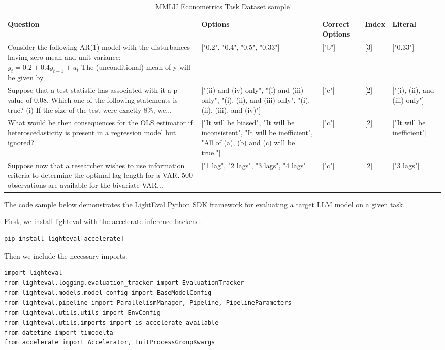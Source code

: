 \begin{table*}[h]
\caption{MMLU Econometrics Task Dataset sample}
\label{mmlu-econometrics}
\begin{tabular}{p{}p{}p{}p{}p{}}
\hline
Question & Options & Correct Options & Index & Literal \\
\hline
Consider the following AR(1) model with the disturbances having zero mean and unit variance: $y_t = 0.2 + 0.4 y_{t-1} + u_t$ The (unconditional) mean of y will be given by & ["0.2", "0.4", "0.5", "0.33"] & ["b"] & [3] & ["0.33"] \\
\hline
Suppose that a test statistic has associated with it a p-value of 0.08. Which one of the following statements is true? (i) If the size of the test were exactly 8\%, we... & ["(ii) and (iv) only", "(i) and (iii) only", "(i), (ii), and (iii) only", "(i), (ii), (iii), and (iv)"] & ["c"] & [2] & ["(i), (ii), and (iii) only"] \\
\hline
What would be then consequences for the OLS estimator if heteroscedasticity is present in a regression model but ignored? & ["It will be biased", "It will be inconsistent", "It will be inefficient", "All of (a), (b) and (c) will be true."] & ["c"] & [2] & ["It will be inefficient"] \\
\hline
Suppose now that a researcher wishes to use information criteria to determine the optimal lag length for a VAR. 500 observations are available for the bivariate VAR... & ["1 lag", "2 lags", "3 lags", "4 lags"] & ["c"] & [2] & ["3 lags"] \\
\hline
\end{tabular}
\end{table*}
The code sample below demonstrates the LightEval Python SDK framework for evaluating a target LLM model on a given task.

First, we install lighteval with the accelerate inference backend.
\begin{verbatim}
pip install lighteval[accelerate]
\end{verbatim}

Then we include the necessary imports.
\begin{verbatim}
import lighteval
from lighteval.logging.evaluation_tracker import EvaluationTracker
from lighteval.models.model_config import BaseModelConfig
from lighteval.pipeline import ParallelismManager, Pipeline, PipelineParameters
from lighteval.utils.utils import EnvConfig
from lighteval.utils.imports import is_accelerate_available
from datetime import timedelta
from accelerate import Accelerator, InitProcessGroupKwargs
\end{verbatim}

